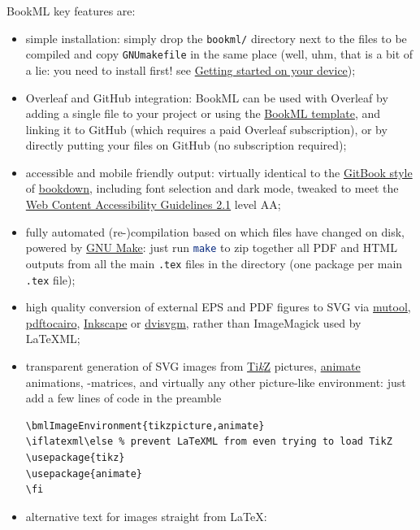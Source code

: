 \documentclass[a4paper,british]{article}
\def\tikzname{Ti\emph{k}Z}
\def\cmdinline{\lstinline[language=bash,frame=none]}
\begin{document}
BookML key features are:
\begin{itemize}
  \item simple installation: simply drop the \texttt{bookml/} directory next to the files to be compiled and copy \texttt{GNUmakefile} in the same place (well, uhm, that is a bit of a lie: you need to install \LaTeXML{} first! see \hyperref[get-started-on-your-device]{Getting started on your device});
  \item Overleaf and GitHub integration: BookML can be used with Overleaf by adding a single file to your project or using the \href{https://www.overleaf.com/latex/templates/bookml-template/nycbmrhpscpx}{BookML template}, and linking it to GitHub (which requires a paid Overleaf subscription), or by directly putting your files on GitHub (no subscription required);
  \item accessible and mobile friendly output: virtually identical to the \href{https://bookdown.org/yihui/bookdown/html.html#gitbook-style}{GitBook style} of \href{https://bookdown.org}{bookdown}, including font selection and dark mode, tweaked to meet the \href{https://www.w3.org/TR/WCAG21/}{Web Content Accessibility Guidelines 2.1} level AA;
  \item fully automated (re-)compilation based on which files have changed on disk, powered by \href{https://www.gnu.org/software/make/}{GNU Make}: just run \cmdinline{make} to zip together all PDF and HTML outputs from all the main \texttt{.tex} files in the directory (one package per main \texttt{.tex} file);
  \item high quality conversion of external EPS and PDF figures to SVG via \href{https://mupdf.readthedocs.io/en/latest/tools/mutool.html}{mutool}, \href{https://poppler.freedesktop.org/}{pdftocairo}, \href{https://inkscape.org/}{Inkscape} or \href{https://dvisvgm.de}{dvisvgm}, rather than ImageMagick used by LaTeXML;
  \item transparent generation of SVG images from \href{https://tikz.net/}{\tikzname} pictures, \href{https://ctan.org/pkg/animate}{animate} animations, \Xy-matrices, and virtually any other picture-like environment: just add a few lines of code in the preamble
    \begin{lstlisting}[style=bookml]
\bmlImageEnvironment{tikzpicture,animate}
\iflatexml\else % prevent LaTeXML from even trying to load TikZ
\usepackage{tikz}
\usepackage{animate}
\fi
    \end{lstlisting}
  \item alternative text for images straight from \LaTeX:

\end{itemize}
\end{document}
